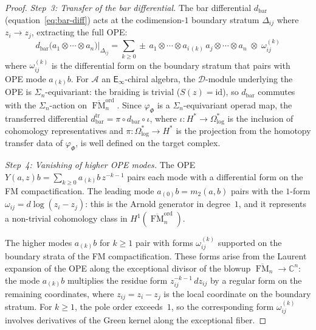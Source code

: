 \documentclass[11pt,reqno]{amsart}
\theoremstyle{definition}
\theoremstyle{remark}
\newcommand{\cA}{\mathcal{A}}
\newcommand{\cD}{\mathcal{D}}
\newcommand{\Einf}{\mathsf{E}_{\infty}}
\DeclareMathOperator{\FM}{FM}
\newcommand{\CC}{\mathbb{C}}
\newcommand{\id}{\mathrm{id}}
\numberwithin{equation}{section}
\begin{document}
\begin{proof}
\medskip
\noindent\textit{Step~3: Transfer of the bar differential.}
The bar differential $d_{\mathrm{bar}}$
\textup{(}equation~\eqref{eq:bar-diff}\textup{)}
acts at the codimension-$1$ boundary stratum
$\Delta_{ij}$ where $z_i \to z_j$, extracting the
full OPE:
\[
  d_{\mathrm{bar}}
  \bigl(a_1 \otimes \cdots \otimes a_n\bigr)
  \big|_{\Delta_{ij}}
  = \sum_{k \geq 0} \pm\,
  a_1 \otimes \cdots \otimes a_{i\,(k)}\, a_j
  \otimes \cdots \otimes a_n
  \;\otimes\; \omega_{ij}^{(k)}
\]
where $\omega_{ij}^{(k)}$ is the differential form on
the boundary stratum that pairs with OPE mode
$a_{(k)}b$.
For $\cA$ an $\Einf$-chiral algebra, the $\cD$-module
underlying the OPE is $\Sigma_n$-equivariant: the
braiding is trivial \textup{(}$S(z) = \id$\textup{)},
so $d_{\mathrm{bar}}$ commutes with the
$\Sigma_n$-action on $\overline{\FM}_n^{\mathrm{ord}}$.
Since $\varphi_\Phi$ is a $\Sigma_n$-equivariant operad
map, the transferred differential
$d_{\mathrm{bar}}^{\mathrm{tr}}
= \pi \circ d_{\mathrm{bar}} \circ \iota$,
where $\iota \colon H^* \to \Omega^*_{\log}$ is
the inclusion of cohomology representatives and
$\pi \colon \Omega^*_{\log} \to H^*$ is the projection
from the homotopy transfer data of $\varphi_\Phi$,
is well defined on the target complex.

\medskip
\noindent\textit{Step~4: Vanishing of higher OPE modes.}
The OPE $Y(a,z)b = \sum_{k \geq 0} a_{(k)}b\, z^{-k-1}$
pairs each mode with a differential form on the FM
compactification. The leading mode
$a_{(0)}b = m_2(a,b)$ pairs with the $1$-form
$\omega_{ij} = d\log(z_i - z_j)$: this is the Arnold
generator in degree~$1$, and it represents a non-trivial
cohomology class in
$H^1(\overline{\FM}_n^{\mathrm{ord}})$.

The higher modes $a_{(k)}b$ for $k \geq 1$ pair with
forms $\omega_{ij}^{(k)}$ supported on the boundary
strata of the FM compactification. These forms arise
from the Laurent expansion of the OPE along the
exceptional divisor of the blowup
$\overline{\FM}_n \to \CC^n$: the mode $a_{(k)}b$
multiplies the residue form
$z_{ij}^{-k-1}\,dz_{ij}$ by a regular form on the
remaining coordinates, where $z_{ij} = z_i - z_j$ is
the local coordinate on the boundary stratum. For
$k \geq 1$, the pole order exceeds~$1$, so the
corresponding form $\omega_{ij}^{(k)}$ involves
derivatives of the Green kernel along the exceptional
fiber.


\end{proof}
\end{document}
